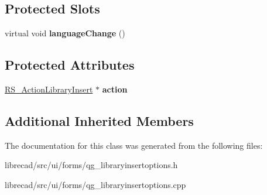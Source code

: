 \subsection*{Protected Slots}
\begin{DoxyCompactItemize}
\item 
\hypertarget{classQG__LibraryInsertOptions_a8e3406fed8c48ee7fa5ad80fd1e6268b}{virtual void {\bfseries language\-Change} ()}\label{classQG__LibraryInsertOptions_a8e3406fed8c48ee7fa5ad80fd1e6268b}

\end{DoxyCompactItemize}
\subsection*{Protected Attributes}
\begin{DoxyCompactItemize}
\item 
\hypertarget{classQG__LibraryInsertOptions_ae646ea6b512838aac9114d913d666a93}{\hyperlink{classRS__ActionLibraryInsert}{R\-S\-\_\-\-Action\-Library\-Insert} $\ast$ {\bfseries action}}\label{classQG__LibraryInsertOptions_ae646ea6b512838aac9114d913d666a93}

\end{DoxyCompactItemize}
\subsection*{Additional Inherited Members}


The documentation for this class was generated from the following files\-:\begin{DoxyCompactItemize}
\item 
librecad/src/ui/forms/qg\-\_\-libraryinsertoptions.\-h\item 
librecad/src/ui/forms/qg\-\_\-libraryinsertoptions.\-cpp\end{DoxyCompactItemize}
